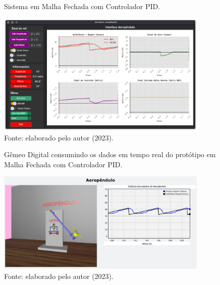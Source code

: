 \begin{figure}[!h]
	\centering
	\caption{Sistema em Malha Fechada com Controlador PID.}
	\includegraphics[width=0.9\textwidth]{Capitulos/3_1_resultados_discurcao/3_figuras/mf_gui_den1.png}
	\caption*{Fonte: elaborado pelo autor (2023).}
	\label{fig3:image_26}
\end{figure}


\begin{figure}[!h]
	\centering
	\caption{Gêmeo Digital consumindo os dados em tempo real do protótipo em Malha Fechada com Controlador PID.}
	\includegraphics[width=0.9\textwidth]{Capitulos/3_1_resultados_discurcao/3_figuras/mf_gem_den1.png}
	\caption*{Fonte: elaborado pelo autor (2023).}
	\label{fig3:image_27}
\end{figure}


